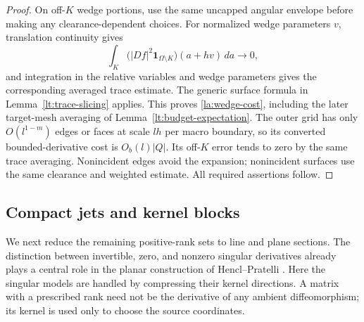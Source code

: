 \documentclass[11pt]{article}
\numberwithin{equation}{section}
\theoremstyle{definition}
\theoremstyle{remark}
\begin{document}
\begin{proof}
On off-$K$ wedge portions, use the same uncapped angular envelope
before making any clearance-dependent choices.  For normalized wedge
parameters $v$, translation continuity gives
\[
 \int_K
  \bigl(|Df|^2\mathbf1_{\Omega\setminus K}\bigr)(a+hv)\,da
       \longrightarrow0,
\]
and integration in the relative variables and wedge parameters
gives the corresponding averaged trace estimate.  The generic
surface formula in Lemma~\ref{lt:trace-slicing} applies.  This proves
\eqref{la:wedge-cost}, including the later target-mesh averaging of
Lemma~\ref{lt:budget-expectation}.  The outer grid has only
$O(l^{1-m})$ edges or faces at scale $lh$ per macro boundary, so its
converted bounded-derivative cost is $O_b(l)|Q|$.  Its off-$K$ error
tends to zero by the same trace averaging.  Nonincident edges avoid
the expansion; nonincident surfaces use the same clearance and
weighted estimate.  All required assertions follow.
\end{proof}

\subsection{Compact jets and kernel blocks}

We next reduce the remaining positive-rank sets to line and plane
sections.  The distinction between invertible, zero, and nonzero
singular derivatives already plays a central role in the planar
construction of Hencl--Pratelli
\cite[Section~1.1 and Section~3]{HenclPratelli2018}.  Here the singular
models are handled by compressing their kernel directions.  A matrix
with a prescribed rank need not be the derivative of any ambient
diffeomorphism; its kernel is used only to choose the source coordinates.
\end{document}
